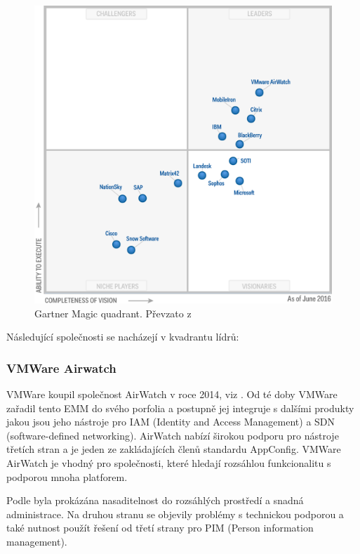  \begin{figure}[h!]
\includegraphics[width=13cm]{img/Gartner_EMM}
\caption{Gartner Magic quadrant. Převzato z \cite{Gartner_EMM_2016}} 
\label{EMM:quadrant}
\centering
\end{figure}%
 
Následující společnosti se nacházejí v kvadrantu lídrů:


\subsubsection{VMWare Airwatch}
VMWare koupil společnost AirWatch v roce 2014, viz \cite{VmBuyAir}. Od té doby VMWare zařadil tento EMM do svého porfolia a postupně jej integruje s dalšími produkty jakou jsou jeho nástroje pro IAM (Identity and Access Management) a SDN (software-defined networking). AirWatch nabízí širokou podporu pro nástroje třetích stran a je jeden ze zakládajících členů standardu AppConfig. VMWare AirWatch je vhodný pro společnosti, které hledají rozsáhlou funkcionalitu s podporou mnoha platforem.

Podle \cite{Gartner_EMM_2016} byla prokázána nasaditelnost do rozsáhlých prostředí a snadná administrace. Na druhou stranu se objevily problémy s technickou podporou a také nutnost použít řešení od třetí strany pro PIM (Person information management).




